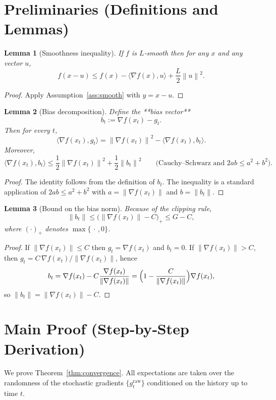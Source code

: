 \documentclass{article}
\newtheorem{lemma}{Lemma}
\newcommand{\norm}[1]{\left\lVert#1\right\rVert}
\begin{document}
\section*{Preliminaries (Definitions and Lemmas)}
\begin{lemma}[Smoothness inequality]\label{lem:smooth}
If $f$ is $L$‑smooth then for any $x$ and any vector $u$,
\[
f(x-u)\le f(x)-\langle\nabla f(x),u\rangle+\frac{L}{2}\norm{u}^{2}.
\]
\end{lemma}
\begin{proof}
Apply Assumption~\ref{ass:smooth} with $y=x-u$.
\end{proof}
\begin{lemma}[Bias decomposition]\label{lem:bias}
Define the **bias vector**
\[
b_{t}:=\nabla f(x_{t})-g_{t}.
\]
Then for every $t$,
\[
\langle\nabla f(x_{t}),g_{t}\rangle
= \norm{\nabla f(x_{t})}^{2}-\langle\nabla f(x_{t}),b_{t}\rangle.
\]
Moreover,
\[
\langle\nabla f(x_{t}),b_{t}\rangle\le\frac{1}{2}\norm{\nabla f(x_{t})}^{2}
+\frac{1}{2}\norm{b_{t}}^{2}
\qquad\text{(Cauchy--Schwarz and }2ab\le a^{2}+b^{2}\text{)}.
\]
\end{lemma}
\begin{proof}
The identity follows from the definition of $b_{t}$. The inequality is a standard application of $2ab\le a^{2}+b^{2}$ with $a=\norm{\nabla f(x_{t})}$ and $b=\norm{b_{t}}$.
\end{proof}
\begin{lemma}[Bound on the bias norm]\label{lem:biasnorm}
Because of the clipping rule,
\[
\norm{b_{t}}\le\bigl(\norm{\nabla f(x_{t})}-C\bigr)_{+}\le G-C,
\]
where $(\cdot)_{+}$ denotes $\max\{\,\cdot\,,0\}$.
\end{lemma}
\begin{proof}
If $\norm{\nabla f(x_{t})}\le C$ then $g_{t}=\nabla f(x_{t})$ and $b_{t}=0$.  
If $\norm{\nabla f(x_{t})}>C$, then $g_{t}=C\,\nabla f(x_{t})/\norm{\nabla f(x_{t})}$, hence
\[
b_{t}= \nabla f(x_{t})-C\frac{\nabla f(x_{t})}{\norm{\nabla f(x_{t})}}
      =\Bigl(1-\frac{C}{\norm{\nabla f(x_{t})}}\Bigr)\nabla f(x_{t}),
\]
so $\norm{b_{t}}=\norm{\nabla f(x_{t})}-C$.
\end{proof}

\section*{Main Proof (Step‑by‑Step Derivation)}
We prove Theorem~\ref{thm:convergence}. All expectations are taken over the randomness of the stochastic gradients $\{g^{\text{raw}}_{t}\}$ conditioned on the history up to time $t$.
\end{document}
